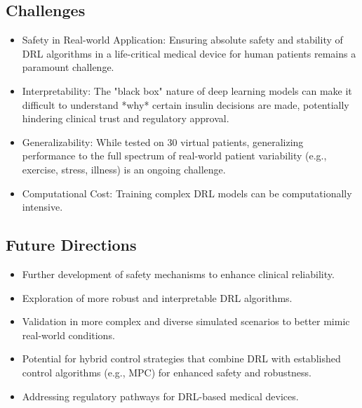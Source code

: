 \subsection*{Challenges}
\begin{itemize}
    \item Safety in Real-world Application: Ensuring absolute safety and stability of DRL algorithms in a life-critical medical device for human patients remains a paramount challenge.
    \item Interpretability: The "black box" nature of deep learning models can make it difficult to understand *why* certain insulin decisions are made, potentially hindering clinical trust and regulatory approval.
    \item Generalizability: While tested on 30 virtual patients, generalizing performance to the full spectrum of real-world patient variability (e.g., exercise, stress, illness) is an ongoing challenge.
    \item Computational Cost: Training complex DRL models can be computationally intensive.
\end{itemize}

\subsection*{Future Directions}
\begin{itemize}
    \item Further development of safety mechanisms to enhance clinical reliability.
    \item Exploration of more robust and interpretable DRL algorithms.
    \item Validation in more complex and diverse simulated scenarios to better mimic real-world conditions.
    \item Potential for hybrid control strategies that combine DRL with established control algorithms (e.g., MPC) for enhanced safety and robustness.
    \item Addressing regulatory pathways for DRL-based medical devices.
\end{itemize}

